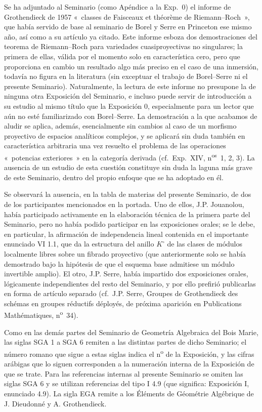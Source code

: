 \documentclass[11pt]{article}
\begin{document}
Se ha adjuntado al Seminario (como Apéndice a la Exp.\ 0) el informe de
Grothendieck de 1957 «~classes de Faisceaux et théorème de Riemann--Roch~»,
que había servido de base al seminario de Borel y Serre en Princeton ese mismo
año, así como a su artículo ya citado. Este informe esboza dos demostraciones
del teorema de Riemann--Roch para variedades cuasiproyectivas no singulares;
la primera de ellas, válida por el momento solo en característica cero, pero
que proporciona en cambio un resultado algo más preciso en el caso de una
inmersión, todavía no figura en la literatura (sin exceptuar el trabajo de
Borel--Serre ni el presente Seminario). Naturalmente, la lectura de este
informe no presupone la de ninguna otra Exposición del Seminario, e incluso
puede servir de introducción a su estudio al mismo título que la Exposición 0,
especialmente para un lector que aún no esté familiarizado con Borel--Serre.
La demostración a la que acabamos de aludir se aplica, además, esencialmente
sin cambios al caso de un morfismo proyectivo de espacios analíticos complejos,
y se aplicará sin duda también en característica arbitraria una vez resuelto el
problema de las operaciones «~potencias exteriores~» en la categoría derivada
(cf.\ Exp.\ XIV, n\textsuperscript{os}~1, 2, 3). La ausencia de un estudio de
esta cuestión constituye sin duda la laguna más grave de este Seminario, dentro
del propio enfoque que se ha adoptado en él.

Se observará la ausencia, en la tabla de materias del presente Seminario, de
dos de los participantes mencionados en la portada. Uno de ellos, J.P.
Jouanolou, había participado activamente en la elaboración técnica de la
primera parte del Seminario, pero no había podido participar en las
exposiciones orales; se le debe, en particular, la afirmación de independencia
lineal contenida en el importante enunciado VI 1.1, que da la estructura del
anillo $K^\circ$ de las clases de módulos localmente libres sobre un fibrado
proyectivo (que anteriormente solo se había demostrado bajo la hipótesis de
que el esquema base admitiese un módulo invertible amplio). El otro, J.P.
Serre, había impartido dos exposiciones orales, lógicamente independientes del
resto del Seminario, y por ello prefirió publicarlas en forma de artículo
separado (cf.\ J.P. Serre, Groupes de Grothendieck des schémas en groupes
réductifs déployés, de próxima aparición en Publications Mathématiques,
n\textsuperscript{o}~34).

Como en las demás partes del Seminario de Geometría Algebraica del Bois Marie,
las siglas SGA 1 a SGA 6 remiten a las distintas partes de dicho Seminario; el
número romano que sigue a estas siglas indica el n\textsuperscript{o} de la
Exposición, y las cifras arábigas que lo siguen corresponden a la numeración
interna de la Exposición de que se trate. Para las referencias internas al
presente Seminario se omiten las siglas SGA 6 y se utilizan referencias del
tipo I 4.9 (que significa: Exposición I, enunciado 4.9). La sigla EGA remite a
los Éléments de Géométrie Algébrique de J. Dieudonné y A. Grothendieck.
\end{document}
